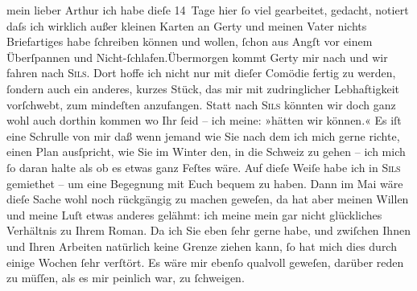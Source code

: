 \pstart{}mein lieber Arthur\pend\vspace{0.5em}
\pstart
           ich habe dieſe 14 Tage hier{ }ſo viel gearbeitet, gedacht, notiert daſs ich wirklich
               außer kleinen Karten an Gerty und meinen Vater nichts Briefartiges
               habe{ }ſchreiben können und wollen,{ }ſchon aus Angſt vor einem Überſpannen und
                  Nicht-ſchlafen.\hspace*{1.5em}Übermorgen kommt Gerty mir nach und {\pb}wir fahren nach \textsc{Sils}. Dort hoffe ich nicht nur mit dieſer Comödie fertig zu werden,{ }ſondern auch ein anderes, kurzes
                  Stück, das mir
               mit zudringlicher Lebhaftigkeit vorſchwebt, zum mindeſten anzufangen. \hspace*{1.5em}Statt nach \textsc{Sils} könnten wir doch ganz wohl auch dorthin kommen wo {\pb}Ihr{ }ſeid – ich meine: »hätten wir
               können.« Es iſt eine Schrulle von mir daß wenn jemand wie Sie nach dem ich mich gerne
               richte, einen Plan ausſpricht, wie Sie im Winter den, in die Schweiz zu gehen – ich mich{ }ſo daran halte als ob es etwas ganz
               Feſtes wäre. Auf dieſe Weiſe habe ich in \textsc{Sils} gemiethet – um eine Begegnung mit Euch {\pb}bequem zu haben. Dann im
                  Mai wäre dieſe Sache wohl noch rückgängig zu machen geweſen, da hat
               aber meinen Willen und meine Luſt etwas anderes gelähmt: ich meine mein gar nicht
               glückliches Verhältnis zu Ihrem Roman. Da ich Sie eben{ }ſehr gerne habe, und zwiſchen Ihnen und Ihren
               Arbeiten natürlich keine Grenze ziehen kann,{ }ſo hat mich dies {\pb}durch einige Wochen{ }ſehr verſtört.
               Es wäre mir ebenſo qualvoll geweſen, darüber reden zu müſſen, als es mir peinlich
               war,  zu{ }ſchweigen.\pend
           
